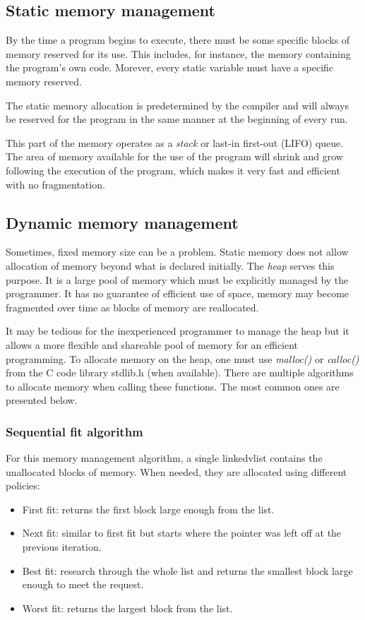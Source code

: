 \subsection{Static memory management}
By the time a program begins to execute, there must be some specific blocks of memory reserved for its use.
This includes, for instance, the memory containing the program's own code.
Morever, every static variable must have a specific memory reserved.

The static memory allocation is predetermined by the compiler
    and will always be reserved for the program in the same manner at the beginning of every run.

This part of the memory operates as a \textit{stack} or last-in first-out (LIFO) queue.
The area of memory available for the use of the program will shrink and grow following the execution of the program,
which makes it very fast and efficient with no fragmentation.

\subsection{Dynamic memory management}
Sometimes, fixed memory size can be a problem.
Static memory does not allow allocation of memory beyond what is declared initially.
The \textit{heap} serves this purpose.
It is a large pool of memory which must be explicitly managed by the programmer.
It has no guarantee of efficient use of space, memory may become fragmented over time as blocks of memory are reallocated.

It may be tedious for the inexperienced programmer to manage the heap
    but it allows a more flexible and shareable pool of memory for an efficient programming.
To allocate memory on the heap, one must use \textit{malloc()} or \textit{calloc()} from the C code library stdlib.h (when available).
There are multiple algorithms to allocate memory when calling these functions.
The most common ones are presented below\cite{mem-mgmt-algo}.

\subsubsection{Sequential fit algorithm}
For this memory management algorithm, a single linkedvlist contains the unallocated blocks of memory.
When needed, they are allocated using different policies:
\begin{itemize}
    \item First fit: returns the first block large enough from the list.
    \item Next fit: similar to first fit but starts where the pointer was left off at the previous iteration.
    \item Best fit: research through the whole list and returns the smallest block large enough to meet the request.
    \item Worst fit: returns the largest block from the list.
\end{itemize}

